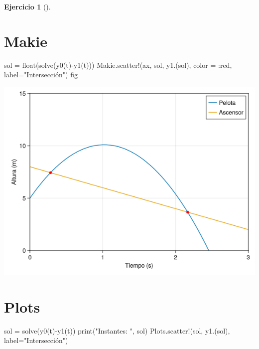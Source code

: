\documentclass[
  a4paper,
]{scrreport}
\newenvironment{Shaded}{\begin{snugshade}}{\end{snugshade}}
\newcommand{\FunctionTok}[1]{\textcolor[rgb]{0.28,0.35,0.67}{#1}}
\newcommand{\NormalTok}[1]{\textcolor[rgb]{0.00,0.23,0.31}{#1}}
\newcommand{\OperatorTok}[1]{\textcolor[rgb]{0.37,0.37,0.37}{#1}}
\newcommand{\StringTok}[1]{\textcolor[rgb]{0.13,0.47,0.30}{#1}}
\theoremstyle{definition}
\newtheorem{exercise}{Ejercicio}[chapter]
\theoremstyle{remark}
\begin{document}
\begin{exercise}[]
\begin{enumerate}
\begin{tcolorbox}
  \section{Makie}

\begin{Shaded}
\begin{Highlighting}[]
\NormalTok{sol }\OperatorTok{=} \FunctionTok{float}\NormalTok{(}\FunctionTok{solve}\NormalTok{(}\FunctionTok{y0}\NormalTok{(t)}\FunctionTok{{-}y1}\NormalTok{(t)))}
\NormalTok{Makie.}\FunctionTok{scatter!}\NormalTok{(ax, sol, }\FunctionTok{y1}\NormalTok{.(sol), color }\OperatorTok{=} \OperatorTok{:}\NormalTok{red, label}\OperatorTok{=}\StringTok{"Intersección"}\NormalTok{)}
\NormalTok{fig}
\end{Highlighting}
\end{Shaded}

  \includegraphics{03-funciones-elementales_files/figure-pdf/cell-11-output-1.png}

  \section{Plots}

\begin{Shaded}
\begin{Highlighting}[]
\NormalTok{sol }\OperatorTok{=} \FunctionTok{solve}\NormalTok{(}\FunctionTok{y0}\NormalTok{(t)}\FunctionTok{{-}y1}\NormalTok{(t))}
\FunctionTok{print}\NormalTok{(}\StringTok{"Instantes: "}\NormalTok{, sol)}
\NormalTok{Plots.}\FunctionTok{scatter!}\NormalTok{(sol, }\FunctionTok{y1}\NormalTok{.(sol), label}\OperatorTok{=}\StringTok{"Intersección"}\NormalTok{)}
\end{Highlighting}
\end{Shaded}


\end{tcolorbox}
\end{enumerate}
\end{exercise}
\end{document}
